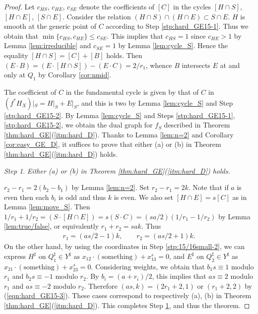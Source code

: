 \documentclass[a4paper,11pt]{amsart}
\theoremstyle{definition}
\theoremstyle{remark}
\newtheorem{step}{Step}
\numberwithin{equation}{section}
\newcommand{\something}{\mathrm{something}}
\begin{document}
\begin{proof}
Let $c_{HS}$, $c_{HE}$, $c_{SE}$ denote the coefficients of $[C]$
in the cycles $[H \cap S]$, $[H \cap E]$, $[S \cap E]$.
Consider the relation $(H \cap S) \cap (H \cap E) \subset S \cap E$.
$H$ is smooth at the generic point of $C$
according to Step \ref{stp:hard_GE15-1}.
Thus we obtain that $\min\{c_{HS},c_{HE}\} \le c_{SE}$.
This implies that $c_{HS}=1$ since
$c_{HE}>1$ by Lemma \ref{lem:irreducible} and
$c_{SE}=1$ by Lemma \ref{lem:cycle_S}.
Hence the equality $[H \cap S]=[C]+[B]$ holds.
Then $(E \cdot B)=(E \cdot [H \cap S])-(E \cdot C)=2/r_1$,
whence $B$ intersects $E$ at and only at $Q_1$ by Corollary \ref{cor:nmid}.

The coefficient of $C$ in the fundamental cycle is
given by that of $C$ in $(f^*H_X)|_S= H|_S+E|_S$,
and this is two by Lemma \ref{lem:cycle_S} and Step \ref{stp:hard_GE15-2}.
By Lemma \ref{lem:cycle_S} and
Steps \ref{stp:hard_GE15-1}, \ref{stp:hard_GE15-2},
we obtain the dual graph for $f_S$ described
in Theorem \ref{thm:hard_GE}(\ref{itm:hard_D}).
Thanks to Lemma \ref{lem:n=2} and Corollary \ref{cor:easy_GE_D},
it suffices to prove that
either (a) or (b) in Theorem \ref{thm:hard_GE}(\ref{itm:hard_D}) holds.

\begin{step}\label{stp:hard_GE15-3}
\itshape
Either \textup{(a)} or \textup{(b)}
in Theorem \textup{\ref{thm:hard_GE}(\ref{itm:hard_D})} holds.
\end{step}

$r_2-r_1=2(b_2-b_1)$ by Lemma \ref{lem:n=2}.
Set $r_2-r_1=2k$.
Note that if $a$ is even then each $b_i$ is odd and thus $k$ is even.
We also set $[H \cap E]=s[C]$ as in Lemma \ref{lem:move_S}.
Then $1/r_1+1/r_2=(S \cdot [H \cap E])=s(S \cdot C)=(sa/2)(1/r_1-1/r_2)$
by Lemma \ref{lem:true/false},
or equivalently $r_1+r_2=sak$.
Thus
\begin{align}\label{eqn:hard_GE15-3}
r_1=(as/2-1)k,\qquad r_2=(as/2+1)k.
\end{align}
On the other hand,
by using the coordinates in Step \ref{stp:15/16small-2},
we can express $H^\sharp$ on $Q_1^\sharp \in Y^\sharp$ as
$x_{12}\cdot(\something)+x_{13}^s=0$,
and $E^\sharp$ on $Q_2^\sharp \in Y^\sharp$ as
$x_{21}\cdot(\something)+x_{23}^s=0$.
Considering weights,
we obtain that $b_1s\equiv 1$ modulo $r_1$ and $b_2s\equiv -1$ modulo $r_2$.
By $b_i=(a+r_i)/2$,
this implies that $as\equiv 2$ modulo $r_1$ and $as\equiv -2$ modulo $r_2$.
Therefore $(as,k)=(2r_1+2,1)$ or $(r_1+2,2)$ by (\ref{eqn:hard_GE15-3}).
These cases correspond to respectively (a), (b)
in Theorem \ref{thm:hard_GE}(\ref{itm:hard_D}).
This completes Step \ref{stp:hard_GE15-3},
and thus the theorem.
\setcounter{step}{0}
\end{proof}
\end{document}
